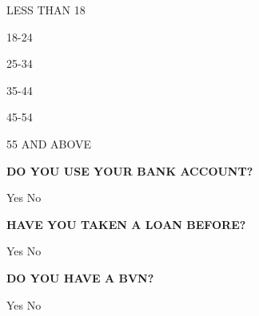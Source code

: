 \documentclass[a5paper]{sdapsclassic}
\begin{document}
\begin{questionnaire}
\begin{enumerate*}
\item[{\small LESS THAN 18} \mycheckbox{}{}] 
\item[{\normalsize 18-24}\mycheckbox{}{}]
\item[{\normalsize 25-34}\mycheckbox{}{}]
\item[{\normalsize 35-44}\mycheckbox{}{}]
\item[{\normalsize 45-54}\mycheckbox{}{}]
\item[{\small 55 AND ABOVE} \mycheckbox{}{}] 
\end{enumerate*}
\vspace{2ex}
\par\begin{minipage}{10em}
\small{\textbf{{\textrm{DO YOU USE YOUR BANK ACCOUNT? }}}}
\end{minipage}\hspace{1ex}\begin{minipage}{3em}\scriptsize Yes\hspace{1ex}\mycheckbox{}{} \scriptsize\hspace{1ex}No \hspace{1ex}\mycheckbox{}{} 
\end{minipage}
\begin{minipage}{9em}
\small{\textbf{{HAVE YOU TAKEN A LOAN BEFORE? }}}
\end{minipage}\hspace{1ex}\begin{minipage}{3em}\scriptsize Yes\hspace{1ex}\mycheckbox{}{} \scriptsize \hspace{1ex}No \hspace{1ex}\mycheckbox{}{} 
\end{minipage}
\begin{minipage}{7em}\small{\textbf{DO YOU HAVE A BVN?}}\end{minipage}
\hspace{1ex}\begin{minipage}{3em}\scriptsize Yes\hspace{1ex}\mycheckbox{}{} \scriptsize \hspace{1ex}No \hspace{1ex}\mycheckbox{}{} 
\end{minipage}
\end{questionnaire}
\end{document}
